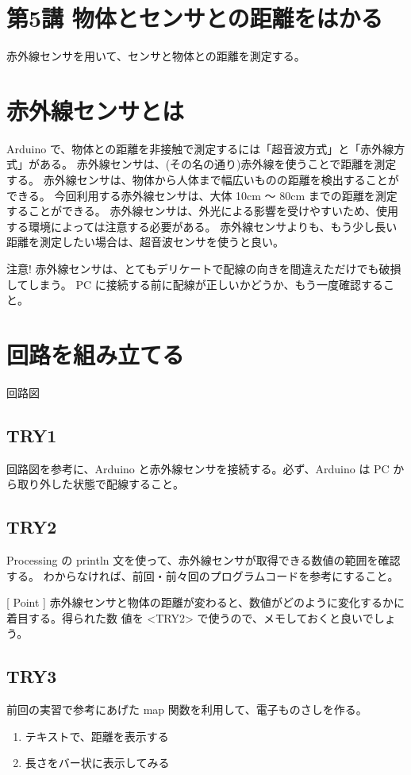 \documentclass[11pt,a4paper]{jarticle}
\begin{document}
\section*{\LARGE{第5講 物体とセンサとの距離をはかる}}
赤外線センサを用いて、センサと物体との距離を測定する。


\section{赤外線センサとは}
Arduino で、物体との距離を非接触で測定するには「超音波方式」と「赤外線方式」がある。
赤外線センサは、(その名の通り)赤外線を使うことで距離を測定する。
赤外線センサは、物体から人体まで幅広いものの距離を検出することができる。
今回利用する赤外線センサは、大体 10cm 〜 80cm までの距離を測定することができる。
赤外線センサは、外光による影響を受けやすいため、使用する環境によっては注意する必要がある。
赤外線センサよりも、もう少し長い距離を測定したい場合は、超音波センサを使うと良い。

\begin{itembox}{注意!}
 赤外線センサは、とてもデリケートで配線の向きを間違えただけでも破損してしまう。
 PC に接続する前に配線が正しいかどうか、もう一度確認すること。
\end{itembox}

\section{回路を組み立てる}

回路図

\subsection*{TRY1}
回路図を参考に、Arduino と赤外線センサを接続する。必ず、Arduino は PC から取り外した状態で配線すること。

\subsection*{TRY2}
Processing の println 文を使って、赤外線センサが取得できる数値の範囲を確認する。
わからなければ、前回・前々回のプログラムコードを参考にすること。

[ Point ]
 赤外線センサと物体の距離が変わると、数値がどのように変化するかに着目する。得られた数
値を <TRY2> で使うので、メモしておくと良いでしょう。

\subsection*{TRY3}
前回の実習で参考にあげた map 関数を利用して、電子ものさしを作る。
\begin{enumerate}
 \item テキストで、距離を表示する
 \item 長さをバー状に表示してみる
\end{enumerate}
\end{document}
